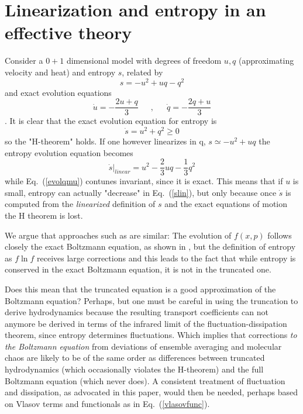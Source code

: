 \documentclass[12pt,onecolumn,showpacs,amssymb,aps,nofootinbib,floatfix]{revtex4-2}
\renewcommand{\eqref}[1]{Eq.~(\ref{#1})}
\newcommand{\eqcomma}{\phantom{AA},\phantom{AA}}
\begin{document}
\section{Linearization and entropy in an effective theory \label{apptoy}}  
Consider a $0+1$ dimensional model with degrees of freedom $u,q$ (approximating velocity and heat) and entropy $s$, related by
 \begin{equation}
s=-u^2+u q - q^2
\end{equation}
and exact evolution equations
\begin{equation}
\label{evolqmu}
\dot{u}=-\frac{2 u+q}{3} \eqcomma \dot{q}=-\frac{2 q+u}{3}
\end{equation}.
It is clear that the exact evolution equation for entropy is
\begin{equation}
\dot{s}=u^2 + q^2 \geq 0
\end{equation} 
so the "H-theorem" holds.
If one however linearizes in q, $s\simeq -u^2+u q$ the entropy evolution equation becomes 
\begin{equation}
\label{slin}
\left. \dot{s} \right|_{linear}=u^2 -\frac{2}{3} u q -\frac{1}{3} q^2
\end{equation} 
while \eqref{evolqmu} contunes invariant, since it is exact.    This means that if $u$ is small, entropy can actually "decrease" in \eqref{slin}, but only because once $\dot{s}$ is computed from the {\em linearized} definition of $s$ and the exact equations of motion the H theorem is lost.   

We argue that approaches such as \cite{kovtunani} are similar:  The evolution of $f(x,p)$ follows closely the
exact Boltzmann equation, as shown in \cite{denicol}, but the definition of entropy as $f \ln f$ receives large corrections and this leads to the fact that while entropy is conserved in the exact Boltzmann equation, it is not in the truncated one.

Does this mean that the truncated equation is a good approximation of the Boltzmann equation?  Perhaps, but one must be careful in using the truncation to derive hydrodynamics because the resulting transport coefficients can not anymore be derived in terms of the infrared limit of the fluctuation-dissipation theorem, since entropy determines fluctuations.      Which implies that corrections {\em to the Boltzmann equation} from deviations of ensemble averaging and molecular chaos are likely to be of the same order as differences between truncated hydrodynamics (which occasionally violates the H-theorem) and the full Boltzmann equation (which never does).
A consistent treatment of fluctuation and dissipation, as advocated in this paper, would then be needed, perhaps based on Vlasov terms and functionals as in \eqref{vlasovfunc}.
		\medskip

	
	
\end{document}
